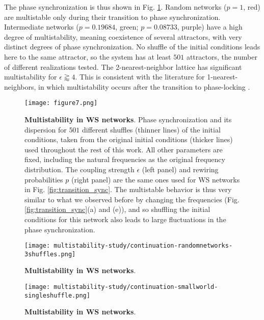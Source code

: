 The phase synchronization is thus shown in Fig. \ref{fig:multistability}. Random networks ($p = 1$, red) are multistable only during their transition to phase synchronization. Intermediate networks ($p = 0.19684$, green; $p = 0.08733$, purple) have a high degree of multistability, meaning coexistence of several attractors, with very distinct degrees of phase synchronization. No shuffle of the initial conditions leads here to the same attractor, so the system has at least $501$ attractors, the number of different realizations tested.
The 2-nearest-neighbor lattice has significant multistability for $\epsilon \gtrapprox 4$. This is consistent with the literature for 1-nearest-neighbors, in which multistability occurs after the transition to phase-locking \cite{tilles2011multistable}. 
%
\begin{figure}[htb!]
    \centering
    \texttt{[image: figure7.png]}
    \caption{\textbf{Multistability in WS networks}. Phase synchronization and its dispersion for $501$ different shuffles (thinner lines) of the initial conditions, taken from the original initial conditions (thicker lines) used throughout the rest of this work. All other parameters are fixed, including the natural frequencies as the original frequency distribution. The coupling strength $\epsilon$ (left panel) and rewiring probabilities $p$ (right panel) are the same ones used for WS networks in Fig. \ref{fig:transition_sync}. The multistable behavior is thus very similar to what we observed before by changing the frequencies (Fig. \ref{fig:transition_sync}(a) and (e)), and so shuffling the initial conditions for this network also leads to large fluctuations in the phase synchronization. }
    \label{fig:multistability}
\end{figure}

\begin{figure}[htb!]
    \centering
    \texttt{[image: multistability-study/continuation-randomnetworks-3shuffles.png]}
    \caption{\textbf{Multistability in WS networks}.}
    \label{fig:multistability-random}
\end{figure}


\begin{figure}[htb!]
    \centering
    \texttt{[image: multistability-study/continuation-smallworld-singleshuffle.png]}
    \caption{\textbf{Multistability in WS networks}.}
    \label{fig:multistability-smallworld}
\end{figure}



